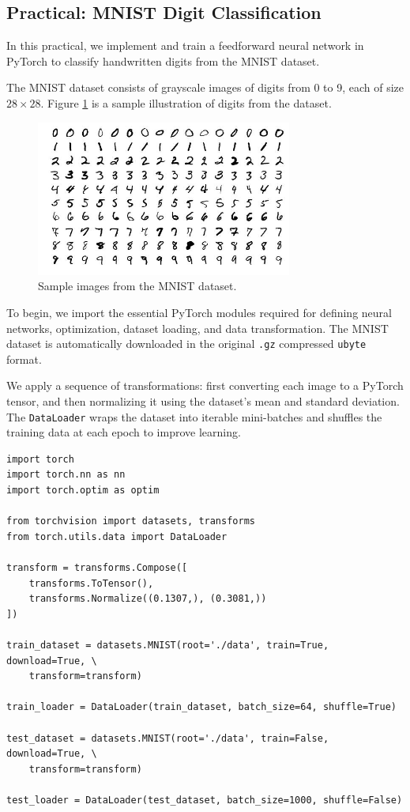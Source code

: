 \subsection{Practical: MNIST Digit Classification}

In this practical, we implement and train a feedforward neural network in PyTorch to classify handwritten digits from the MNIST dataset. 

The MNIST dataset consists of grayscale images of digits from 0 to 9, each of size \(28 \times 28\). Figure \ref{fig:mnist-samples} is a sample illustration of digits from the dataset.

\begin{figure}[h!]
    \centering
    \includegraphics[width=0.75\textwidth]{content/section01/chapter01/figs/mnist.jpg}
    \caption{Sample images from the MNIST dataset.}
    \label{fig:mnist-samples}
\end{figure}

To begin, we import the essential PyTorch modules required for defining neural networks, optimization, dataset loading, and data transformation. The MNIST dataset is automatically downloaded in the original \texttt{.gz} compressed \texttt{ubyte} format. 

We apply a sequence of transformations: first converting each image to a PyTorch tensor, and then normalizing it using the dataset’s mean and standard deviation. The \texttt{DataLoader} wraps the dataset into iterable mini-batches and shuffles the training data at each epoch to improve learning.

\begin{tcolorbox}[codebox]
\begin{verbatim}
import torch
import torch.nn as nn
import torch.optim as optim

from torchvision import datasets, transforms
from torch.utils.data import DataLoader

transform = transforms.Compose([
    transforms.ToTensor(),
    transforms.Normalize((0.1307,), (0.3081,))
])

train_dataset = datasets.MNIST(root='./data', train=True, download=True, \
    transform=transform)

train_loader = DataLoader(train_dataset, batch_size=64, shuffle=True)

test_dataset = datasets.MNIST(root='./data', train=False, download=True, \
    transform=transform)

test_loader = DataLoader(test_dataset, batch_size=1000, shuffle=False)
\end{verbatim}
\end{tcolorbox}

